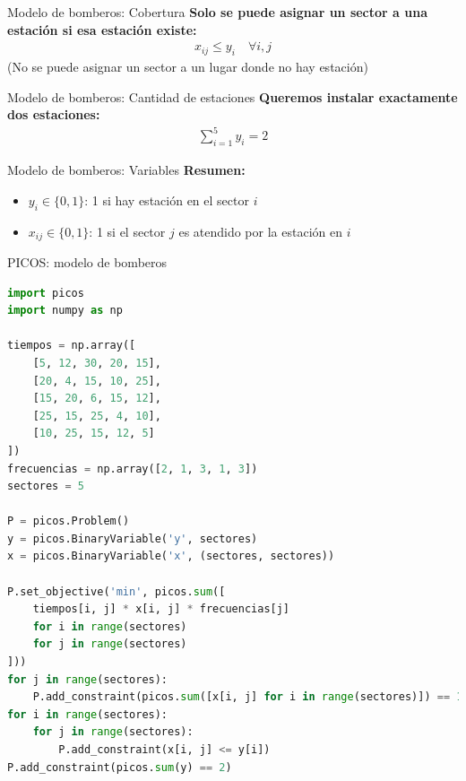 \documentclass{beamer}
\begin{document}
\begin{frame}{Modelo de bomberos: Cobertura}
    \textbf{Solo se puede asignar un sector a una estación si esa estación existe:}
    \begin{align*}
        x_{ij} \leq y_i \quad \forall i, j
    \end{align*}
    (No se puede asignar un sector a un lugar donde no hay estación)
\end{frame}

\begin{frame}{Modelo de bomberos: Cantidad de estaciones}
    \textbf{Queremos instalar exactamente dos estaciones:}
    \begin{align*}
        \sum_{i=1}^{5} y_i = 2
    \end{align*}
\end{frame}

\begin{frame}{Modelo de bomberos: Variables}
    \textbf{Resumen:}
    \begin{itemize}
        \item $y_i \in \{0,1\}$: 1 si hay estación en el sector $i$
        \item $x_{ij} \in \{0,1\}$: 1 si el sector $j$ es atendido por la estación en $i$
    \end{itemize}
\end{frame}

\begin{frame}[fragile]{PICOS: modelo de bomberos}
    \begin{lstlisting}[language=Python]
import picos
import numpy as np

tiempos = np.array([
    [5, 12, 30, 20, 15],
    [20, 4, 15, 10, 25],
    [15, 20, 6, 15, 12],
    [25, 15, 25, 4, 10],
    [10, 25, 15, 12, 5]
])
frecuencias = np.array([2, 1, 3, 1, 3])
sectores = 5

P = picos.Problem()
y = picos.BinaryVariable('y', sectores)
x = picos.BinaryVariable('x', (sectores, sectores))

P.set_objective('min', picos.sum([
    tiempos[i, j] * x[i, j] * frecuencias[j]
    for i in range(sectores)
    for j in range(sectores)
]))
for j in range(sectores):
    P.add_constraint(picos.sum([x[i, j] for i in range(sectores)]) == 1)
for i in range(sectores):
    for j in range(sectores):
        P.add_constraint(x[i, j] <= y[i])
P.add_constraint(picos.sum(y) == 2)
    \end{lstlisting}
\end{frame}
\end{document}
